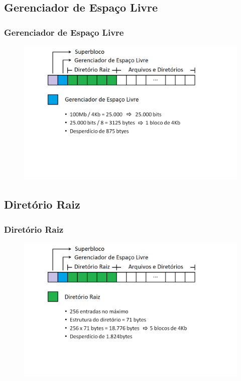 \documentclass{beamer}
\begin{document}
\subsection{Gerenciador de Espaço Livre}
\begin{frame}
\frametitle{Gerenciador de Espaço Livre}
\begin{figure}
\centering
\includegraphics[scale=0.35]{gerenciadorpng.png}
\end{figure}
\justifying
\end{frame}


\subsection{Diretório Raiz}
\begin{frame}
\frametitle{Diretório Raiz}
\begin{figure}
\centering
\includegraphics[scale=0.35]{raizpng.png}
\end{figure}
\justifying
\end{frame}
\end{document}
